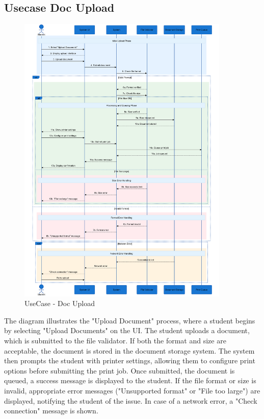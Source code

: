 \subsection{Usecase Doc Upload}

\begin{figure}[H]
    \centering
    \includegraphics[width=0.9\textwidth]{images/sequence_diagram/Upload Doc.png}
    \caption{UseCase - Doc Upload}
    \label{fig:upload_doc}
\end{figure}

The diagram illustrates the "Upload Document" process, where a student begins by selecting "Upload Documents" on the UI. The student uploads a document, which is submitted to the file validator. If both the format and size are acceptable, the document is stored in the document storage system. The system then prompts the student with printer settings, allowing them to configure print options before submitting the print job. Once submitted, the document is queued, a success message is displayed to the student. If the file format or size is invalid, appropriate error messages ("Unsupported format" or "File too large") are displayed, notifying the student of the issue. In case of a network error, a "Check connection" message is shown.


